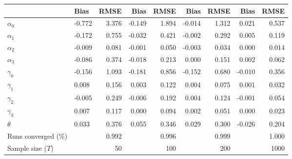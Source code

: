 
\begin{tabular}[t]{llrrrrrrr}
\toprule
  & Bias & RMSE & Bias & RMSE & Bias & RMSE & Bias & RMSE\\
\midrule
$\alpha_{0}$ & -0.772 & 3.376 & -0.149 & 1.894 & -0.014 & 1.312 & 0.021 & 0.537\\
$\alpha_{1}$ & -0.172 & 0.755 & -0.032 & 0.421 & -0.002 & 0.292 & 0.005 & 0.119\\
$\alpha_{2}$ & -0.009 & 0.081 & -0.001 & 0.050 & -0.003 & 0.034 & 0.000 & 0.014\\
$\alpha_{3}$ & -0.086 & 0.374 & -0.018 & 0.213 & 0.000 & 0.151 & 0.002 & 0.062\\
$\gamma_{0}$ & -0.156 & 1.093 & -0.181 & 0.856 & -0.152 & 0.680 & -0.010 & 0.356\\
$\gamma_{1}$ & 0.008 & 0.156 & 0.003 & 0.122 & 0.004 & 0.075 & 0.001 & 0.032\\
$\gamma_{2}$ & -0.005 & 0.249 & -0.006 & 0.192 & 0.004 & 0.124 & -0.001 & 0.054\\
$\gamma_{3}$ & 0.007 & 0.117 & 0.000 & 0.094 & 0.002 & 0.051 & 0.000 & 0.023\\
$\theta$ & 0.033 & 0.376 & 0.055 & 0.346 & 0.029 & 0.300 & -0.026 & 0.204\\
Runs converged (\%) &  & 0.992 &  & 0.996 &  & 0.999 &  & 1.000\\
Sample size ($T$) &  & 50 &  & 100 &  & 200 &  & 1000\\
\bottomrule
\end{tabular}
